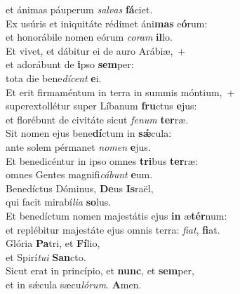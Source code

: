 \oddverse et ánimas páuperum \textit{sal}\textit{vas} \textbf{fá}ciet.\\
\evenverse Ex usúris et iniquitáte rédimet áni\textbf{mas} e\textbf{ó}rum:~\*\\
\evenverse et honorábile nomen eórum \textit{co}\textit{ram} \textbf{il}lo.\\
\oddverse Et vivet, et dábitur ei de auro Arábiæ,~+\\
\oddverse  et adorábunt de \textbf{i}pso \textbf{sem}per:~\*\\
\oddverse tota die bene\textit{dí}\textit{cent} \textbf{e}i.\\
\evenverse Et erit firmaméntum in terra in summis móntium,~+\\
\evenverse  superextollétur super Líbanum \textbf{fru}ctus \textbf{e}jus:~\*\\
\evenverse et florébunt de civitáte sicut \textit{fe}\textit{num} \textbf{ter}ræ.\\
\oddverse Sit nomen ejus bene\textbf{dí}ctum in \textbf{sǽ}cula:~\*\\
\oddverse ante solem pérmanet \textit{no}\textit{men} \textbf{e}jus.\\
\evenverse Et benedicéntur in ipso omnes \textbf{tri}bus \textbf{ter}ræ:~\*\\
\evenverse omnes Gentes magnifi\textit{cá}\textit{bunt} \textbf{e}um.\\
\oddverse Benedíctus Dóminus, \textbf{De}us \textbf{Is}raël,~\*\\
\oddverse qui facit mirabí\textit{li}\textit{a} \textbf{so}lus.\\
\evenverse Et benedíctum nomen majestátis ejus \textbf{in} æ\textbf{tér}num:~\*\\
\evenverse et replébitur majestáte ejus omnis terra: \textit{fi}\textit{at}, \textbf{fi}at.\\
\oddverse Glória \textbf{Pa}tri, et \textbf{Fí}lio,~\*\\
\oddverse et Spirí\textit{tu}\textit{i} \textbf{San}cto.\\
\evenverse Sicut erat in princípio, et \textbf{nunc}, et \textbf{sem}per,~\*\\
\evenverse et in sǽcula sæcu\textit{ló}\textit{rum}. \textbf{A}men.\\
